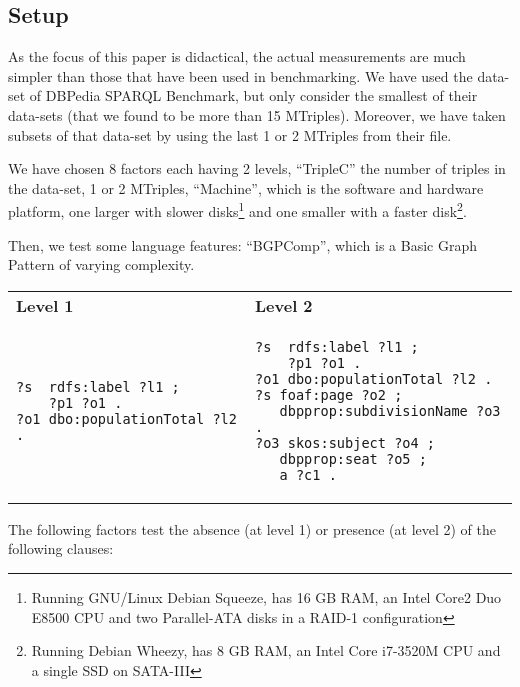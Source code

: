 \documentclass{llncs}
\begin{document}
\subsection{Setup}

As the focus of this paper is didactical, the actual measurements are
much simpler than those that have been used in benchmarking. We have used the
data-set of DBPedia SPARQL Benchmark\cite{mxro:Morsey2011DBpedia}, but
only consider the smallest of their data-sets (that we found to be
more than 15 MTriples). Moreover, we have taken subsets of that
data-set by using the last 1 or 2 MTriples from their file.


We have chosen 8 factors each having 2 levels, ``TripleC'' the number
of triples in the data-set, 1 or 2 MTriples, ``Machine'', which is the
software and hardware platform, one larger with slower
disks\footnote{Running GNU/Linux Debian Squeeze, has 16 GB RAM, an
  Intel Core2 Duo E8500 CPU and two Parallel-ATA disks in a RAID-1
  configuration} and one smaller with a faster disk\footnote{Running
  Debian Wheezy, has 8 GB RAM, an Intel Core i7-3520M CPU and a single
  SSD on SATA-III}.

Then, we test some language features: ``BGPComp'', which is a Basic
Graph Pattern of varying complexity. 

  \begin{center}\small
    \begin{tabular}{|@{~~}p{}|@{~~}p{}|}
      \hline
      \textbf{Level 1} & \textbf{Level 2} \\[-2ex] 
      \begin{verbatim}
?s  rdfs:label ?l1 ;
    ?p1 ?o1 .
?o1 dbo:populationTotal ?l2 .
      \end{verbatim}
      & 
      \begin{verbatim}
?s  rdfs:label ?l1 ;
    ?p1 ?o1 .
?o1 dbo:populationTotal ?l2 .
?s foaf:page ?o2 ;
   dbpprop:subdivisionName ?o3 .
?o3 skos:subject ?o4 ;
   dbpprop:seat ?o5 ;
   a ?c1 .\end{verbatim} 
\\      \hline
    \end{tabular}
  \end{center}

The following factors test the absence (at level 1) or presence (at
level 2) of the following clauses:
\end{document}
